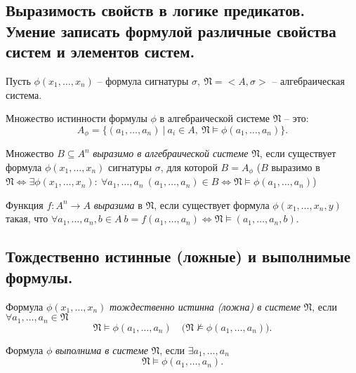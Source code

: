 \subsection{Выразимость свойств в логике предикатов. Умение записать формулой различные свойства систем и элементов систем.}

\begin{note}
    Пусть $ \phi(x_1,\ldots,x_n) $ -- формула сигнатуры $ \sigma, \ \mathfrak{N} = <A,\sigma> $ -- алгебраическая система.

    Множество истинности формулы $ \phi $ в алгебраической системе $ \mathfrak{N} $ -- это:
    \[
        A_\phi = \big\{(a_1,\ldots,a_n) \ \big| \ a_i \in A, \ \mathfrak{N} \vDash \phi(a_1,\ldots,a_n)\big\}.
    \]
\end{note}

\begin{definition}
    Множество $ B \subseteq A^n $ \emph{выразимо в алгебраической системе} $ \mathfrak{N} $, если существует формула $ \phi(x_1,\ldots,x_n) $ сигнатуры $ \sigma $, для которой $ B = A_\phi $ ($ B $ выразимо в $ \mathfrak{N} \iff \exists \phi(x_1,\ldots,x_n): \ \forall a_1,\ldots,a_n \ (a_1,\ldots,a_n) \in B \iff \mathfrak{N}\vDash \phi(a_1,\ldots,a_n) $)
\end{definition}

\begin{definition}
    Функция $ f: A^n \rightarrow A $ \emph{выразима} в $ \mathfrak{N} $, если существует формула $ \phi(x_1,\ldots,x_n,y) $ такая, что $ \forall a_1,\ldots,a_n,b \in A \ b = f(a_1,\ldots,a_n) \iff \mathfrak{N}\vDash (a_1,\ldots,a_n,b) $.
\end{definition}

\subsection{Тождественно истинные (ложные) и выполнимые формулы.}

\begin{definition}
    Формула $ \phi(x_1,\ldots,x_n) $ \emph{тождественно истинна (ложна) в системе} $ \mathfrak{N} $, если $ \forall a_1,\ldots,a_n \in \mathfrak{N} $
    \[
        \mathfrak{N} \vDash \phi(a_1,\ldots,a_n) \quad \big(\mathfrak{N}\nvDash \phi(a_1,\ldots,a_n)\big).
    \]

    Формула $ \phi $ \emph{выполнима в системе} $ \mathfrak{N} $, если $ \exists a_1,\ldots,a_n $
    \[
        \mathfrak{N} \vDash \phi(a_1,\ldots,a_n).
    \]
\end{definition}

